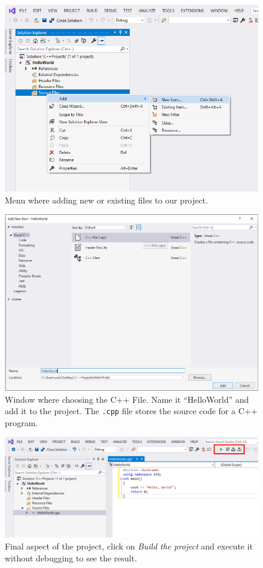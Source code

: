 \begin{figure}
    \centering
    \includegraphics[width= \textwidth]{Figures/C++3}
    \caption{Menu where adding new or existing files to our project.}
    \label{fig:C++3}
\end{figure}

\begin{figure}
    \centering
    \includegraphics[width= \textwidth]{Figures/C++4}
    \caption{Window where choosing the C++ File. Name it ``HelloWorld'' and add it to the project. The \texttt{.cpp} file stores the source code for a C++ program.}
    \label{fig:C++4}
\end{figure}    
 
\begin{figure}
    \centering
    \includegraphics[width= \textwidth]{Figures/C++5}
    \caption{Final aspect of the project, click on \textit{Build the project} and execute it without debugging to see the result.}
    \label{fig:C++5}
\end{figure}    
 

